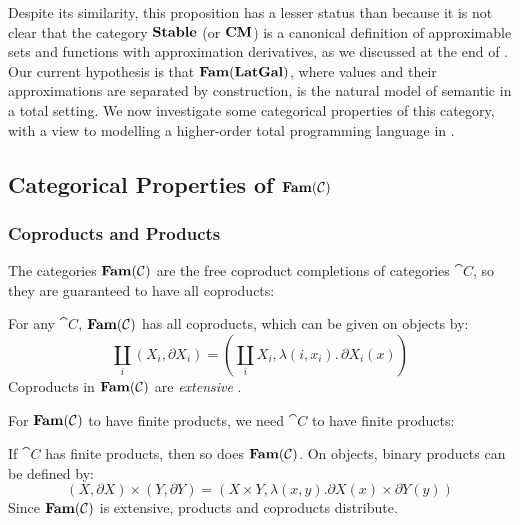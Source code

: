 Despite its similarity, this proposition has a lesser status than
 because it is not clear that the category
$\mathbf{Stable}$ (or $\mathbf{CM}$) is a canonical definition of approximable sets
and functions with approximation derivatives, as we discussed at the
end of .
Our current hypothesis is that $\mathbf{Fam}(\mathbf{LatGal})$, where values and their
approximations are separated by construction, is the natural model of
semantic \GPS in a total setting. We now investigate some categorical
properties of this category, with a view to modelling a higher-order
total programming language in .

\subsection{Categorical Properties of $\mathbf{Fam}(\mathcal{C})$}

\subsubsection{Coproducts and Products}

The categories $\mathbf{Fam}(\mathcal{C})$ are the free coproduct completions of
categories $\cat{C}$, so they are guaranteed to have all coproducts:

\begin{proposition}
  For any $\cat{C}$, $\mathbf{Fam}(\mathcal{C})$ has all coproducts, which can be
  given on objects by:
  \begin{displaymath}
    \coprod_i (X_i, \partial X_i) = (\coprod_i X_i, \lambda (i, x_i).\, \partial X_i(x))
  \end{displaymath}
  Coproducts in $\mathbf{Fam}(\mathcal{C})$ are \emph{extensive}
  \cite[Proposition 2.4]{carboni-lack-walters93}.
\end{proposition}

For $\mathbf{Fam}(\mathcal{C})$ to have finite products, we need $\cat{C}$ to have
finite products:

\begin{proposition}
  If $\cat{C}$ has finite products, then so does $\mathbf{Fam}(\mathcal{C})$. On
  objects, binary products can be defined by:
  \begin{displaymath}
    (X, \partial X) \times (Y, \partial Y) = (X \times Y, \lambda (x, y). \partial X(x) \times \partial Y(y))
  \end{displaymath}
  Since $\mathbf{Fam}(\mathcal{C})$ is extensive, products and coproducts
  distribute.
\end{proposition}

